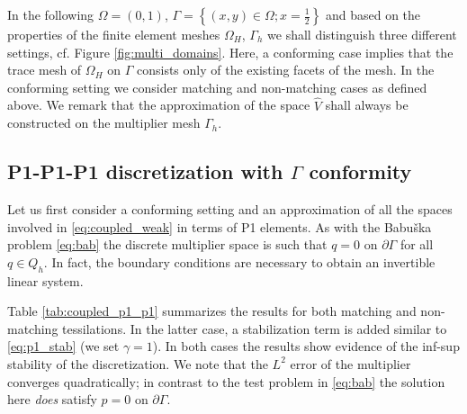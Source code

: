 \documentclass[r]{siamart171218}
\begin{document}
%
In the following $\Omega=(0, 1)$, $\Gamma=\left\{(x, y)\in\Omega; x=\tfrac{1}{2}\right\}$
and based on the properties of the finite element meshes $\Omega_H$, $\Gamma_h$
we shall distinguish three different settings, cf. Figure \ref{fig:multi_domains}.
Here, a conforming case implies that the trace mesh of $\Omega_H$ on $\Gamma$
consists only of the existing facets of the mesh. In the conforming setting 
we consider matching and non-matching cases as defined above. We remark
that the approximation of the space $\hat{V}$ shall always be constructed
on the multiplier mesh $\Gamma_h$.

\subsection{P1-P1-P1 discretization with $\Gamma$ conformity}
Let us first consider a conforming setting and an approximation of all
the spaces involved in \eqref{eq:coupled_weak} in terms of P1 elements.
As with the Babu{\v s}ka problem \eqref{eq:bab} the discrete multiplier
space is such that $q=0$ on $\partial\Gamma$ for all $q\in Q_h$. In fact,
the boundary conditions are necessary to obtain an invertible linear system.

Table \ref{tab:coupled_p1_p1} summarizes the results for both matching
and non-matching tessilations. In the latter case, a stabilization term
\cite{burman2009interior} is added similar to \eqref{eq:p1_stab} (we set $\gamma=1$).
In both cases the results show evidence of the inf-sup stability of the
discretization. We note that the $L^2$ error of the multiplier converges
quadratically; in contrast to the test problem in \eqref{eq:bab} the solution
here \emph{does} satisfy $p=0$ on $\partial\Gamma$.
\end{document}
